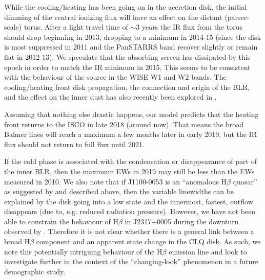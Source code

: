 \documentclass[a4paper,fleqn,usenatbib]{mnras}
\begin{document}
While the cooling/heating has been going on in the accretion disk, the
initial dimming of the central ionizing flux will have an effect on
the distant (parsec-scale) torus. After a light travel time of $\sim
3$ years the IR flux from the torus should drop \citep{Koshida2014,
Jun2015b} beginning in 2013, dropping to a minimum in 2014-15 (since
the disk is most suppressed in 2011 and the PanSTARRS band recover
slightly or remain flat in 2012-13). We speculate that the absorbing
screen has dissipated by this epoch in order to match the IR minimum
in 2015. This seems to be consistent with the behaviour of the source
in the WISE W1 and W2 bands. The cooling/heating front disk
propagation, the connection and origin of the BLR, and the effect on
the inner dust has also recently been explored in
\citet{Baskin_Laor2018}.

Assuming that nothing else drastic happens, our model predicts that
the heating front returns to the ISCO in late 2018 (around now). That
means the broad Balmer lines will reach a maximum a few months later
in early 2019, but the IR flux should not return to full flux until 2021. 

If the cold phase is associated with the condensation or disappearance
of part of the inner BLR, then the maximum EWs in 2019 may still be
less than the EWs measured in 2010. We also note that if J1100-0053 is
an ``anomalous H$\beta$ quasar'' as suggested by
\citet{Steinhardt_Silverman2013} and described above, then the
variable linewidths can be explained by the disk going into a low
state and the innermost, fastest, outflow disappears (due to,
e.g. reduced radiation pressure). However, we have not been able to
constrain the behaviour of H$\beta$ in J2317+0005 during the downturn
observed by \citep{Guo2016}. Therefore it is not clear whether there
is a general link between a broad H$\beta$ component and an apparent
state change in the CLQ disk. As such, we note this potentially
intriguing behaviour of the H$\beta$ emission line and look to
investigate further in the context of the ``changing-look'' phenomenon
in a future demographic study.
\end{document}
